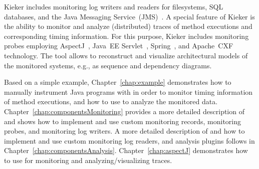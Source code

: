 Kieker includes monitoring log writers and readers for filesystems, SQL %
databases, and the Java Messaging Service~(JMS)~\cite{JMS-WebSite}. %
A special feature of Kieker is the ability to monitor and analyze (distributed) %
traces of method executions and corresponding timing information. %
For this purpose, Kieker includes monitoring probes employing %
AspectJ~\cite{AspectJ-WebSite}, %
Java~EE Servlet~\cite{JavaServletTechnology-WebSite}, %
Spring~\cite{Spring-WebSite}, and %
Apache~CXF~\cite{CXF-WebSite} technology. %
The \KiekerTraceAnalysis{} tool allows to reconstruct and visualize %
architectural models of the monitored systems, e.g., as sequence and %
dependency diagrams.


Based on a simple example, Chapter~\ref{chap:example} demonstrates %
how to manually instrument Java programs with \KiekerMonitoringPart{} %
in order to monitor timing information of method executions, and %
how to use \KiekerAnalysisPart{} to analyze the monitored data. %
Chapter~\ref{chap:componentsMonitoring} provides a more detailed %
description of \KiekerMonitoringPart{} and shows how to implement and %
use custom monitoring records, monitoring probes, and monitoring log writers. %
A more detailed description of \KiekerAnalysisPart{} and how to implement and use %
custom monitoring log readers, and analysis plugins follows in %
Chapter~\ref{chap:componentsAnalysis}. %
Chapter~\ref{chap:aspectJ} demonstrates how to use \KiekerTraceAnalysis{} %
for monitoring and analyzing/visualizing traces. %

\quad\\


